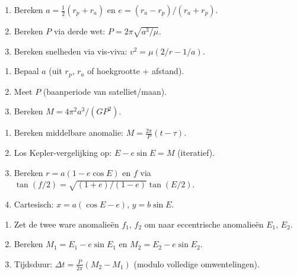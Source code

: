 \documentclass[11pt, a4paper]{article}
\begin{document}
\begin{tip}
\begin{enumerate}[leftmargin=1.5em, itemsep=3pt]
  \item Bereken $a = \tfrac{1}{2}(r_p + r_a)$ en $e = (r_a - r_p)/(r_a + r_p)$.
  \item Bereken $P$ via derde wet: $P = 2\pi\sqrt{a^3/\mu}$.
  \item Bereken snelheden via vis-viva: $v^2 = \mu(2/r - 1/a)$.
\end{enumerate}
\end{tip}

\begin{tip}
\begin{enumerate}[leftmargin=1.5em, itemsep=3pt]
  \item Bepaal $a$ (uit $r_p$, $r_a$ of hoekgrootte + afstand).
  \item Meet $P$ (baanperiode van satelliet/maan).
  \item Bereken $M = 4\pi^2 a^3 / (G P^2)$.
\end{enumerate}
\end{tip}

\begin{tip}
\begin{enumerate}[leftmargin=1.5em, itemsep=3pt]
  \item Bereken middelbare anomalie: $M = \tfrac{2\pi}{P}(t - \tau)$.
  \item Los Kepler-vergelijking op: $E - e\sin E = M$ (iteratief).
  \item Bereken $r = a(1-e\cos E)$ en $f$ via $\tan(f/2) = \sqrt{(1+e)/(1-e)}\tan(E/2)$.
  \item Cartesisch: $x = a(\cos E - e)$, $y = b\sin E$.
\end{enumerate}
\end{tip}

\begin{tip}
\begin{enumerate}[leftmargin=1.5em, itemsep=3pt]
  \item Zet de twee ware anomalieën $f_1$, $f_2$ om naar eccentrische anomalieën $E_1$, $E_2$.
  \item Bereken $M_1 = E_1 - e\sin E_1$ en $M_2 = E_2 - e\sin E_2$.
  \item Tijdsduur: $\Delta t = \tfrac{P}{2\pi}(M_2 - M_1)$ \quad (modulo volledige omwentelingen).
\end{enumerate}
\end{tip}
\end{document}
